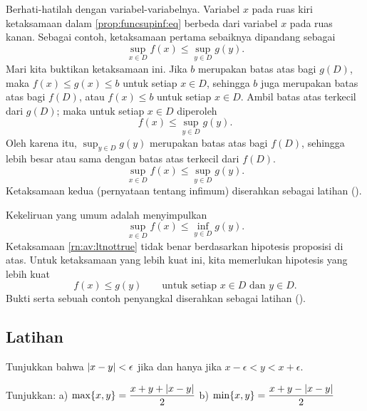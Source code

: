 Berhati-hatilah dengan variabel-variabelnya.  Variabel $x$ pada ruas kiri
ketaksamaan dalam \eqref{prop:funcsupinf:eq}
berbeda dari variabel $x$ pada ruas kanan.  Sebagai contoh,
ketaksamaan pertama sebaiknya dipandang sebagai
\begin{equation*}
\sup_{x \in D} f(x) \leq \sup_{y \in D} g(y) .
\end{equation*}
Mari kita buktikan ketaksamaan ini.  Jika $b$ merupakan batas atas bagi $g(D)$, maka
$f(x) \leq g(x) \leq b$ untuk setiap $x \in D$, sehingga $b$ juga merupakan batas
atas bagi $f(D)$,
atau $f(x) \leq b$ untuk setiap $x \in D$.
Ambil batas atas terkecil dari $g(D)$; maka untuk setiap $x \in D$ diperoleh
\begin{equation*}
f(x) \leq \sup_{y \in D} g(y) .
\end{equation*}
Oleh karena itu,
$\sup_{y \in D} g(y)$ merupakan batas atas bagi $f(D)$, sehingga lebih besar atau
sama dengan batas atas terkecil dari $f(D)$.
\begin{equation*}
\sup_{x \in D} f(x) \leq \sup_{y \in D} g(y) .
\end{equation*}
Ketaksamaan kedua (pernyataan tentang infimum) diserahkan sebagai latihan
().

\medskip

Kekeliruan yang umum adalah menyimpulkan
\begin{equation} \label{rn:av:ltnottrue}
\sup_{x \in D} f(x) \leq \inf_{y \in D} g(y) .
\end{equation}
Ketaksamaan \eqref{rn:av:ltnottrue} tidak benar berdasarkan hipotesis
proposisi di atas.  Untuk ketaksamaan yang lebih kuat ini,
kita memerlukan hipotesis yang lebih kuat
\begin{equation*}
f(x) \leq g(y) \qquad \text{untuk setiap } x \in D \text{ dan } y \in D.
\end{equation*}
Bukti serta sebuah contoh penyangkal diserahkan sebagai latihan
().

\subsection{Latihan}

\begin{exercise}
Tunjukkan bahwa
$\lvert {x-y} \rvert < \epsilon$ jika dan hanya jika $x-\epsilon < y < x+\epsilon$.
\end{exercise}

\begin{exercise}
Tunjukkan: \qquad
a)
$\max \{x,y\} = \dfrac{x+y+\lvert {x-y} \rvert}{2}$
\qquad
b)
$\min \{x,y\} = \dfrac{x+y-\lvert {x-y} \rvert}{2}$
\end{exercise}

